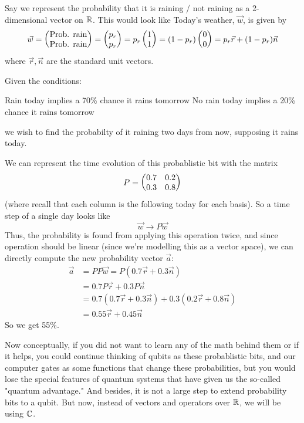 \begin{example}
    Say we represent the probability that it is raining / not raining as a 2-dimensional
    vector on $\RR$.
    This would look like Today's weather, $\vec{w}$, is given by
    \[\vec{w}=\tomat{\text{Prob. rain}}{\text{Prob. no rain}}
    = \tomat{p_r}{1-p_r}
    = p_r\tomat{1}{0} = (1-p_r)\tomat{0}{1}
    = p_r \vec{r} + (1-p_r) \vec{n}\]
    where $\vec{r},\vec{n}$ are the standard unit vectors.
    
    Given the conditions:
    \begin{itemize}
        \ii Rain today implies a 70\% chance it rains tomorrow
        \ii No rain today implies a 20\% chance it rains tomorrow
    \end{itemize}
    we wish to find the probabilty of it raining two days from now,
    supposing it rains today.

    We can represent the time evolution of this probablistic bit with the matrix
    \[P=\ttmat{0.7}{0.2}{0.3}{0.8}\]
    (where recall that each column is the following today for each basis).
    So a time step of a single day looks like
    \[\vec{w}\rightarrow P\vec{w}\]
    Thus, the probability is found from applying this operation twice,
    and since operation should be linear
    (since we're modelling this as a vector space),
    we can directly compute the new probability vector $\vec{a}$:
    \begin{align*}
        \vec{a} &= PP\vec{w} = P(0.7\vec{r}+0.3\vec{n})\\
        &= 0.7P\vec{r} + 0.3P\vec{n}\\
        &= 0.7(0.7\vec{r} + 0.3\vec{n}) + 0.3(0.2\vec{r} + 0.8\vec{n})\\
        &= 0.55\vec{r} + 0.45\vec{n}
    \end{align*}
    So we get 55\%.
\end{example}

Now conceptually, if you did not want to learn any of the math behind them or if it helps,
you could continue thinking of qubits as these probablistic bits,
and our computer gates as some functions that change these probabilities,
but you would lose the special features of quantum systems
that have given us the so-called "quantum advantage."
And besides, it is not a large step to extend probability bits to a qubit.
But now, instead of vectors and operators over $\RR$,
we will be using $\CC$.


